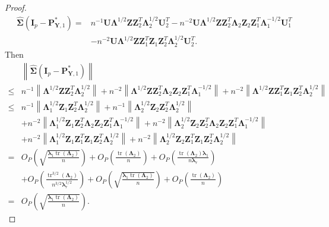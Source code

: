 \documentclass[12pt]{article} %
\DeclareMathOperator{\mytr}{tr}
\newcommand{\bZ}{\mathbf{Z}}
\newcommand{\bP}{\mathbf{P}}
\newcommand{\bY}{\mathbf{Y}}
\newcommand{\bI}{\mathbf{I}}
\newcommand{\bU}{\mathbf{U}}
\newcommand{\bfsym}[1]{\ensuremath{\boldsymbol{#1}}}
\def\blambda {\bfsym {\lambda}}
\def\bLambda {\bfsym {\Lambda}}
\def\bSigma {\bfsym {\Sigma}}
\theoremstyle{definition}
\begin{document}
\begin{appendices}
\begin{proof}
\begin{equation*}
        \begin{split}
             \hat{\bSigma}(\bI_p-\bP^*_{\bY,1})
             =&
             n^{-1} \bU \bLambda^{1/2}\bZ \bZ_2^T \bLambda_2^{1/2} \bU_2^T
             -n^{-2} \bU \bLambda^{1/2} \bZ \bZ_2^T \bLambda_2 \bZ_2 \bZ_1^T \bLambda_1^{-1/2}\bU_1^T
             \\
             &
             -n^{-2} \bU \bLambda^{1/2} \bZ \bZ_1^T \bZ_1 \bZ_2^T \bLambda_2^{1/2}\bU_2^T.
        \end{split}
    \end{equation*}
    Then
    \begin{equation*}
        \begin{split}
             &\left\|\hat{\bSigma}(\bI_p-\bP^*_{\bY,1})\right\|
             \\
             \leq &
             n^{-1} \left\|\bLambda^{1/2}\bZ \bZ_2^T \bLambda_2^{1/2} \right\|
             +n^{-2} \left\| \bLambda^{1/2} \bZ \bZ_2^T \bLambda_2 \bZ_2 \bZ_1^T \bLambda_1^{-1/2}\right\|
             +n^{-2} \left\| \bLambda^{1/2} \bZ \bZ_1^T \bZ_1 \bZ_2^T \bLambda_2^{1/2}\right\|
             \\
             \leq &
             n^{-1} \left\|\bLambda_1^{1/2}\bZ_1 \bZ_2^T \bLambda_2^{1/2} \right\|
             +
             n^{-1} \left\|\bLambda_2^{1/2}\bZ_2 \bZ_2^T \bLambda_2^{1/2} \right\|
             \\
             &+n^{-2} \left\| \bLambda_1^{1/2} \bZ_1 \bZ_2^T \bLambda_2 \bZ_2 \bZ_1^T \bLambda_1^{-1/2}\right\|
             +n^{-2} \left\| \bLambda_2^{1/2} \bZ_2 \bZ_2^T \bLambda_2 \bZ_2 \bZ_1^T \bLambda_1^{-1/2}\right\|
             \\
             &
             +n^{-2} \left\| \bLambda_1^{1/2} \bZ_1 \bZ_1^T \bZ_1 \bZ_2^T \bLambda_2^{1/2}\right\|
             +n^{-2} \left\| \bLambda_2^{1/2} \bZ_2 \bZ_1^T \bZ_1 \bZ_2^T \bLambda_2^{1/2}\right\|
             \\
             =&O_P\left(\sqrt{\frac{\blambda_1 \mytr(\bLambda_2)}{n}}\right)
             +O_P\left(\frac{\mytr(\bLambda_2)}{n}\right)
             +O_P\left(\frac{\mytr(\bLambda_2)\blambda_1}{n\blambda_r}\right)
             \\
             &+O_P\left(\frac{\mytr^{3/2}(\bLambda_2)}{n^{3/2} \blambda_r^{1/2}}\right)
             +O_P\left(\sqrt{\frac{\blambda_1 \mytr(\bLambda_2)}{n}}\right)
             +O_P\left(\frac{\mytr(\bLambda_2)}{n}\right)
             \\
             =&O_P\left(\sqrt{\frac{\blambda_1 \mytr(\bLambda_2)}{n}}\right).

\end{split}
\end{equation*}
\end{proof}
\end{appendices}
\end{document}
